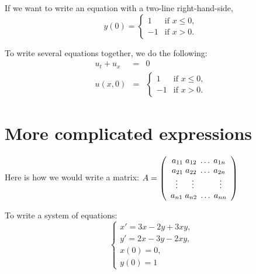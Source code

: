 \documentclass{article}
\begin{document}
If we want to write an equation with a two-line right-hand-side,
\begin{equation}
y(0) = \left\{ \begin{array}{cc}
              1 & \mbox{if $x \le 0$, }\\
              -1 & \mbox{if $x > 0$.}
             \end{array} \right.
\end{equation}


To write several equations together, we do the following:
\begin{eqnarray}
\label{eqn:wave}
u_t + u_x & = & 0 \nonumber \\
u(x, 0) & = & \left\{ \begin{array}{cc}
              1 & \mbox{if $x \le 0$, }\\
              -1 & \mbox{if $x > 0$.}
             \end{array} \right.
\end{eqnarray}


\section{More complicated expressions}
\label{comp}
\setcounter{equation}{0}

Here is how we would write a matrix:
$ A = \left( \begin{array}{ccc} a_{11} \hspace{1mm} a_{12} \hspace{1mm}
                                    \ldots \hspace{1mm} a_{1n} \\
                              a_{21} \hspace{1mm} a_{22} \hspace{1mm}
                                     \ldots \hspace{1mm} a_{2n} \\
                              \vdots \hspace{6mm} \vdots \hspace{11mm} \vdots \\
                              a_{n1} \hspace{1mm} a_{n2} \hspace{1mm}
                                     \ldots \hspace{1mm} a_{nn}
              \end{array}  \right) $


To write a system of equations:
\begin{equation}
\label{eq:pred}
\left\{  \begin{array}{c}
                        x'  =  3x - 2y + 3xy, \nonumber \\
                        y'  =  2x - 3y - 2xy, \\
                        x(0)  =  0, \nonumber \\
                        y(0)  =  1 \nonumber
           \end{array}  \right.
\end{equation}
\end{document}
